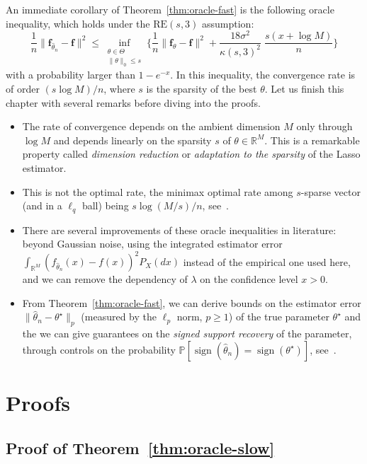 \documentclass[
	fontsize=11pt, %
	twoside=false, %
	numbers=noenddot, %
]{kaobook}
\renewcommand{\bf}{{\boldsymbol f}}
\renewcommand{\P}{\mathbb P}
\newcommand{\R}{\mathbb R}
\newcommand{\wh}{\widehat}
\newcommand{\norm}[1]{\| #1 \|}
\DeclareMathOperator{\sign}{sign}
\begin{document}
An immediate corollary of Theorem~\ref{thm:oracle-fast} is the following oracle inequality, which holds under the $\text{RE}(s, 3)$ assumption:
\begin{equation*}
	\frac 1n \norm{\bf_{\wh \theta_n} - \bf}^2 \leq 
	\inf_{\substack{\theta \in \Theta \\ \norm{\theta}_0 \leq s}}
	\bigg\{ \frac 1n  \norm{\bf_{\theta} - \bf}^2  + \frac{18 \sigma^2}{\kappa(s, 3)^2} 
	\; \frac{s(x + \log M)}{n} \bigg\}
\end{equation*}
with a probability larger than $1 - e^{-x}$.
In this inequality, the convergence rate is of order $(s \log M) / n$, where $s$ is the sparsity of the best $\theta$.
Let us finish this chapter with several remarks before diving into the proofs.
\begin{itemize}
	\item The rate of convergence depends on the ambient dimension $M$ only through $\log M$ and depends linearly on the sparsity $s$ of $\theta \in \R^M$. This is a remarkable property called \emph{dimension reduction} or \emph{adaptation to the sparsity} of the Lasso estimator.
	\item This is not the optimal rate, the minimax optimal rate among $s$-sparse vector (and in a $\ell_q$ ball) being $s \log(M / s) / n$, see~.
	\item There are several improvements of these oracle inequalities in literature: beyond Gaussian noise, using the integrated estimator error $\int_{\R^M} (f_{\wh \theta_n}(x) - f(x))^2 P_X(dx)$ instead of the empirical one used here, and we can remove the dependency of $\lambda$ on the confidence level $x > 0$.
	\item From Theorem~\ref{thm:oracle-fast}, we can derive bounds on the estimator error $\norm{\wh \theta_n - \theta^\star}_p$ (measured by the $\ell_p$ norm, $p \geq 1$) of the true parameter $\theta^\star$ and the we can give guarantees on the \emph{signed support recovery} of the parameter, through controls on the probability 
	$\P[ \sign(\wh \theta_n) = \sign(\theta^\star)]$, see~.
\end{itemize}

\section{Proofs} %
\label{sec:lasso-proofs}


\subsection{Proof of Theorem~\ref{thm:oracle-slow}} %
\label{sub:proof_of_theorem_thm:oracle-slow}
\end{document}
